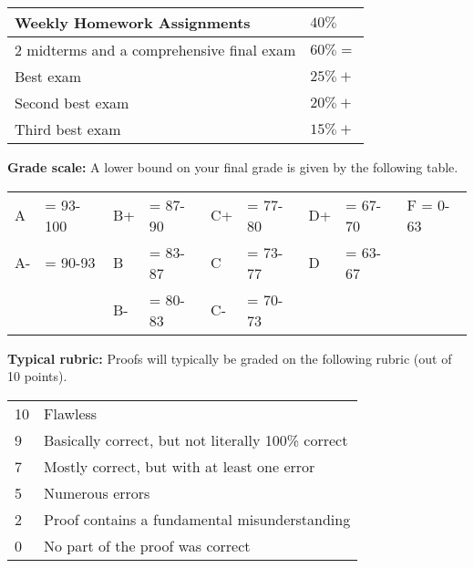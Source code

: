 \documentclass[12pt]{article}
\begin{document}
\begin{center}
  \begin{tabular}{|l|l|}
    \hline
    Weekly Homework Assignments & $40\%$ \\
    \hline    
    2 midterms and a comprehensive final exam  & $60\% = $ 	 \\
    Best exam  & $25\% + $ 	 \\
    Second best exam& $20\% + $ 	 \\
    Third best exam & $15\% + $ 	 \\    
    \hline
  \end{tabular}
\end{center}

\vspace*{.15in}
\noindent\textbf{Grade scale:} 
A lower bound on your final grade is given by the following table. 

\begin{center}
  \begin{tabular}{|ll|ll|ll|ll|l|}
\hline
A  &\hspace{-3 pt}\hspace{-7 pt}= 93-100   &B+ &\hspace{-7 pt}= 87-90  &C+ &\hspace{-7 pt}= 77-80 & D+ &\hspace{-7 pt}= 67-70  & F = 0-63\\
A- &\hspace{-3 pt}\hspace{-7 pt}= 90-93    &B  &\hspace{-7 pt}= 83-87  & C &\hspace{-7 pt}= 73-77  & D  &\hspace{-7 pt}= 63-67 &\\
   &                         &B- &\hspace{-7 pt}= 80-83  &C- &\hspace{-7 pt}= 70-73 &    &        &\\
    \hline
  \end{tabular}
\end{center}


\vspace*{.15in}
\noindent\textbf{Typical rubric:} 
Proofs will typically be graded on the following rubric (out of 10 points).

\begin{center}
  \begin{tabular}{|l|l|}
    \hline
    10& Flawless\\
    9& Basically correct, but not literally 100\% correct\\
    7& Mostly correct, but with at least one error\\    
    5& Numerous errors\\
    2& Proof contains a fundamental misunderstanding\\
    0& No part of the proof was correct\\
    \hline
  \end{tabular}
\end{center}
\end{document}
